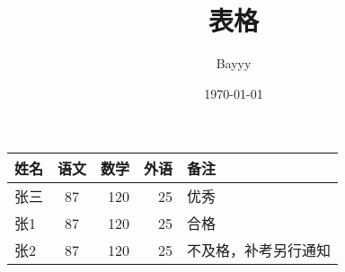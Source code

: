 \documentclass{ctexart}	%
\title{表格}
\author{Bayyy}
\date{\today}
\begin{document}
	\begin{tabular}{|l||c|r|r|p{1.5cm}|}	
		\hline	%
		姓名&语文&数学&外语&备注 \\	%
		\hline \hline
		张三&87&120&25&优秀 \\
		\hline
		张1&87&120&25&合格 \\
		\hline
		张2&87&120&25&不及格，补考另行通知 \\
		\hline
	\end{tabular}
	
\end{document}
